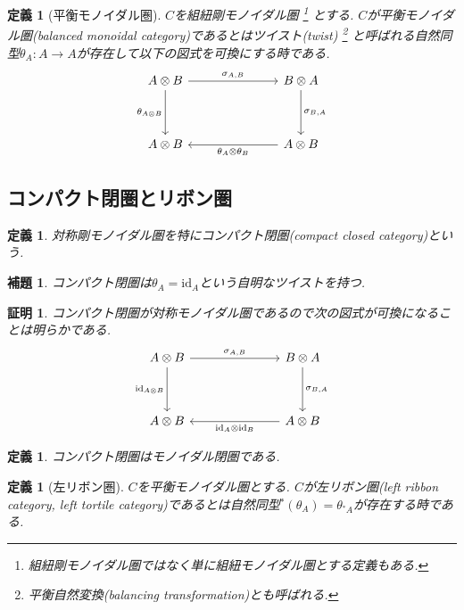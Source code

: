 \documentclass[a4paper,12pt]{ltjsarticle}
\theoremstyle{break}
\newtheorem{defn}[thm]{定義}
\newtheorem{lem}[thm]{補題}
\newtheorem*{prf}{証明}
\newcommand{\id}{\mathrm{id}}
\newcommand{\si}{\sigma}
\newcommand{\ot}{\otimes}
\numberwithin{equation}{section}
\begin{document}
\begin{defn}[平衡モノイダル圏]
  $C$を組紐剛モノイダル圏
  \footnote{
    組紐剛モノイダル圏ではなく単に組紐モノイダル圏とする定義もある. 
  } 
  とする. 
  $C$が平衡モノイダル圏(balanced monoidal category)であるとはツイスト(twist)
  \footnote{
    平衡自然変換(balancing transformation)とも呼ばれる. 
  }
  と呼ばれる自然同型$\theta_A: A \to A$が存在して以下の図式を可換にする時である. 
  \[\begin{tikzcd}
    {A \ot B} &&& {B \ot A} \\
    \\
    {A \ot B} &&& {A \ot B}
    \arrow["{\si_{A,B}}", from=1-1, to=1-4]
    \arrow["{\si_{B,A}}", from=1-4, to=3-4]
    \arrow["{\theta_A \ot \theta_B}", from=3-4, to=3-1]
    \arrow["{\theta_{A \ot B}}"', from=1-1, to=3-1]
  \end{tikzcd}\]
\end{defn}

\subsection{コンパクト閉圏とリボン圏}

\begin{defn}
  対称剛モノイダル圏を特にコンパクト閉圏(compact closed category)という. 
\end{defn}

\begin{lem}
  コンパクト閉圏は$\theta_A=\id_A$という自明なツイストを持つ. 
\end{lem}

\begin{prf}
  コンパクト閉圏が対称モノイダル圏であるので次の図式が可換になることは明らかである.
  \[\begin{tikzcd}
    {A \ot B} &&& {B \ot A} \\
    \\
    {A \ot B} &&& {A \ot B}
    \arrow["{\si_{A,B}}", from=1-1, to=1-4]
    \arrow["{\id_{A \ot B}}"', from=1-1, to=3-1]
    \arrow["{\si_{B,A}}", from=1-4, to=3-4]
    \arrow["{\id_A \ot \id_B}", from=3-4, to=3-1]
  \end{tikzcd}\]
\end{prf}

\begin{defn}
  コンパクト閉圏はモノイダル閉圏である. 
\end{defn}

\begin{defn}[左リボン圏]
  $C$を平衡モノイダル圏とする. $C$が左リボン圏(left ribbon category, left tortile category)であるとは自然同型${}^*(\theta_A)=\theta_{{}^*A}$が存在する時である. 
\end{defn}
\end{document}
